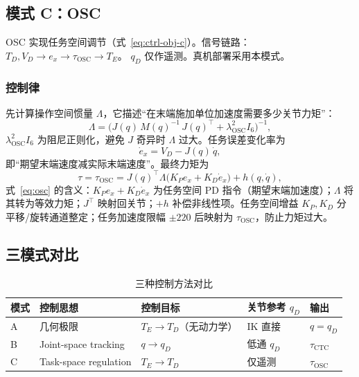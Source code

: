 \documentclass[UTF8, a4paper, 12pt]{ctexart}
\begin{document}
\subsection{模式 C：OSC}

OSC 实现任务空间调节（式~\eqref{eq:ctrl-obj-c}）。信号链路：
$T_D,V_D \rightarrow e_x \rightarrow \tau_{\mathrm{OSC}} \rightarrow T_E$。
$q_D$ 仅作遥测。真机部署采用本模式。

\subsubsection{控制律}

先计算操作空间惯量 $\Lambda$，它描述“在末端施加单位加速度需要多少关节力矩”：
\begin{equation}
    \Lambda = \bigl(J(q)\, M(q)^{-1}\, J(q)^\top + \lambda_{\mathrm{OSC}}^2 I_6\bigr)^{-1},
    \label{eq:lambda}
\end{equation}
$\lambda_{\mathrm{OSC}}^2 I_6$ 为阻尼正则化，避免 $J$ 奇异时 $\Lambda$ 过大。任务误差变化率为
\begin{equation}
    \dot{e}_x = V_D - J(q)\,\dot{q},
\end{equation}
即“期望末端速度减实际末端速度”。最终力矩为
\begin{equation}
    \tau = \tau_{\mathrm{OSC}}
    = J(q)^\top \Lambda \bigl(K_P e_x + K_D \dot{e}_x\bigr) + h(q,\dot{q}),
    \label{eq:osc}
\end{equation}
式~\eqref{eq:osc} 的含义：$K_P e_x + K_D \dot{e}_x$ 为任务空间 PD 指令（期望末端加速度）；$\Lambda$ 将其转为等效力矩；$J^\top$ 映射回关节；$+h$ 补偿非线性项。任务空间增益 $K_P,K_D$ 分平移/旋转通道整定；任务加速度限幅 $\pm 220$ 后映射为 $\tau_{\mathrm{OSC}}$，防止力矩过大。

\subsection{三模式对比}

\begin{table}[H]
  \centering
  \caption{三种控制方法对比}
  \label{tab:mode-compare}
  \begin{tabular}{@{} l l l l l @{}}
    \toprule
    模式 & 控制思想 & 控制目标 & 关节参考 $q_D$ & 输出 \\
    \midrule
    A & 几何极限 & $T_E\!\rightarrow\! T_D$（无动力学） & IK 直接 & $q=q_D$ \\
    B & Joint-space tracking & $q\!\rightarrow\! q_D$ & 低通 $q_D$ & $\tau_{\mathrm{CTC}}$ \\
    C & Task-space regulation & $T_E\!\rightarrow\! T_D$ & 仅遥测 & $\tau_{\mathrm{OSC}}$ \\
    \bottomrule
  \end{tabular}
\end{table}
\end{document}
